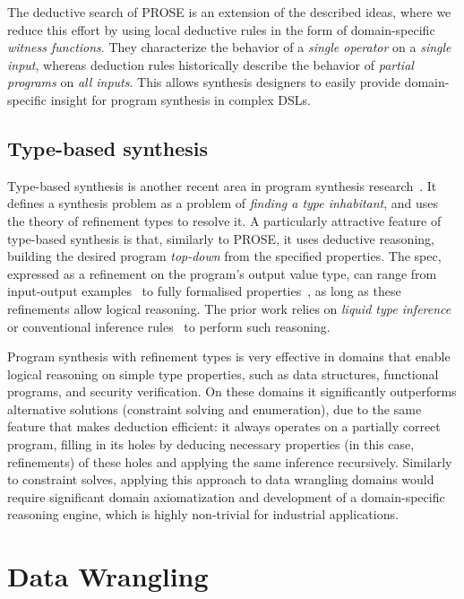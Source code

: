The deductive search of PROSE is an extension of the described ideas, where we reduce this effort by using local
deductive rules in the form of domain\hyp{}specific \emph{witness functions}.
They characterize the behavior of a \emph{single operator} on a \emph{single input}, whereas deduction rules
historically describe the behavior of \emph{partial programs} on \emph{all inputs}.
This allows synthesis designers to easily provide domain\hyp{}specific insight for program synthesis in complex DSLs.

\subsection{Type-based synthesis}

Type-based synthesis is another recent area in program synthesis research~\cite{popl16:frankle,polikarpova2016program}.
It defines a synthesis problem as a problem of \emph{finding a type inhabitant}, and uses the theory of refinement types
to resolve it.
A particularly attractive feature of type-based synthesis is that, similarly to PROSE, it uses
deductive reasoning, building the desired program \emph{top-down} from the specified properties.
The spec, expressed as a refinement on the program's output value type, can range from input-output
examples~\cite{popl16:frankle} to fully formalised properties~\cite{polikarpova2016program}, as long as these
refinements allow logical reasoning.
The prior work relies on \emph{liquid type inference}~\cite{rondon2008liquid} or conventional inference
rules~\cite{pldi15:osera} to perform such reasoning.

Program synthesis with refinement types is very effective in domains that enable logical reasoning on simple type
properties, such as data structures, functional programs, and security verification.
On these domains it significantly outperforms alternative solutions (constraint solving and enumeration), due to the
same feature that makes deduction efficient: it always operates on a partially correct program, filling in its holes by
deducing necessary properties (in this case, refinements) of these holes and applying the same inference recursively.
Similarly to constraint solves, applying this approach to data wrangling domains would require significant domain
axiomatization and development of a domain-specific reasoning engine, which is highly non-trivial for industrial
applications.

\section{Data Wrangling}

